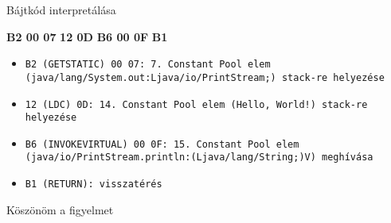 \documentclass[14pt, aspectratio=1610]{beamer}
\begin{document}
\begin{frame}[fragile]{Bájtkód interpretálása}

\alert<2>{\textbf{B2 00 07}} \alert<3>{\textbf{12 0D}} \alert<4>{\textbf{B6 00 0F}} \alert<5>{\textbf{B1}}

\begin{itemize}
    \small \item<2->\texttt{B2 (GETSTATIC) 00 07: 7. Constant Pool elem (java/lang/System.out:Ljava/io/PrintStream;) stack-re helyezése}
    \small \item<3->\texttt{12 (LDC) 0D: 14. Constant Pool elem (Hello, World!) stack-re helyezése}
    \small \item<4->\texttt{B6 (INVOKEVIRTUAL) 00 0F: 15. Constant Pool elem (java/io/PrintStream.println:(Ljava/lang/String;)V) meghívása}
    \small \item<5->\texttt{B1 (RETURN): visszatérés}
\end{itemize}

\end{frame}

\begin{frame}{Köszönöm a figyelmet}

\end{frame}
\end{document}
